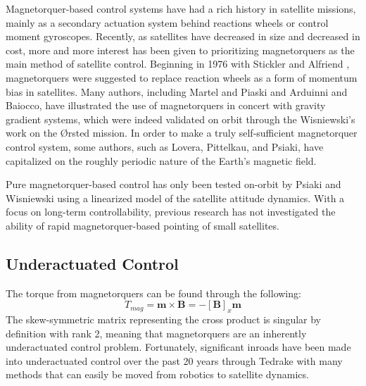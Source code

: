 \documentclass[letterpaper, preprint, paper,11pt]{IAA-AAS}	%
\begin{document}
Magnetorquer-based control systems have had a rich history in satellite missions, mainly as a secondary actuation system behind reactions wheels or control moment gyroscopes. Recently, as satellites have decreased in size and decreased in cost, more and more interest has been given to prioritizing magnetorquers as the main method of satellite control. Beginning in 1976 with Stickler and Alfriend \cite{stickler1976}, magnetorquers were suggested to replace reaction wheels as a form of momentum bias in satellites. Many authors, including Martel and Piaski\cite{martel2008} and Arduinni and Baiocco\cite{arduinni1997}, have illustrated the use of magnetorquers in concert with gravity gradient systems, which were indeed validated on orbit through the Wisniewski’s work on the Ørsted mission\cite{wisniewski200}. In order to make a truly self-sufficient magnetorquer control system, some authors, such as Lovera\cite{lovera2002}, Pittelkau\cite{pittelkau1993}, and Psiaki\cite{psiaki2000}, have capitalized on the roughly periodic nature of the Earth’s magnetic field. 

Pure magnetorquer-based control has only been tested on-orbit by Psiaki\cite{guelmann2005} and Wisniewski\cite{wisniewski2000} using a linearized model of the satellite attitude dynamics. With a focus on long-term controllability, previous research has not investigated the ability of rapid magnetorquer-based pointing of small satellites.

\subsection{Underactuated Control}
The torque from magnetorquers can be found through the following: 
\begin{equation}
	\label{eq:1}
	T_{mag} = \textbf{m} \times \textbf{B} = -[\textbf{B}]_x \textbf{m}
\end{equation}
The skew-symmetric matrix representing the cross product is singular by definition with rank 2, meaning that magnetorquers are an inherently underactuated control problem. Fortunately, significant inroads have been made into underactuated control over the past 20 years through Tedrake\cite{tedrake2009} with many methods that can easily be moved from robotics to satellite dynamics. 
\end{document}
